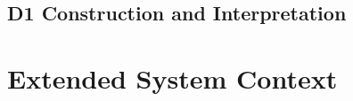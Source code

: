 \documentclass[pdflatex,sn-basic,Numbered]{sn-jnl}
\begin{document}
\subsection{D1 Construction and Interpretation}
\label{app:d1-details}


\FloatBarrier
\section{Extended System Context}
\label{app:related-context}


\end{document}
